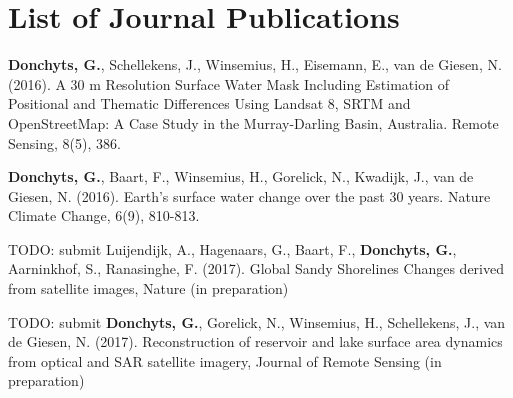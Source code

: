 \chapter*{List of Journal Publications}
\label{publications}

\begin{etaremune}{\small

\item \textbf{Donchyts, G.}, Schellekens, J., Winsemius, H., Eisemann, E., van de Giesen, N. (2016). A 30 m Resolution Surface Water Mask Including Estimation of Positional and Thematic Differences Using Landsat 8, SRTM and OpenStreetMap: A Case Study in the Murray-Darling Basin, Australia. Remote Sensing, 8(5), 386.

\item \textbf{Donchyts, G.}, Baart, F., Winsemius, H., Gorelick, N., Kwadijk, J., van de Giesen, N. (2016). Earth's surface water change over the past 30 years. Nature Climate Change, 6(9), 810-813.

\item TODO: submit Luijendijk, A., Hagenaars, G., Baart, F., \textbf{Donchyts, G.}, Aarninkhof, S., Ranasinghe, F. (2017). Global Sandy Shorelines Changes derived from satellite images, Nature (in preparation)

\item TODO: submit \textbf{Donchyts, G.}, Gorelick, N., Winsemius, H., Schellekens, J., van de Giesen, N. (2017). Reconstruction of reservoir and lake surface area dynamics from optical and SAR satellite imagery, Journal of Remote Sensing (in preparation)

}\end{etaremune}

